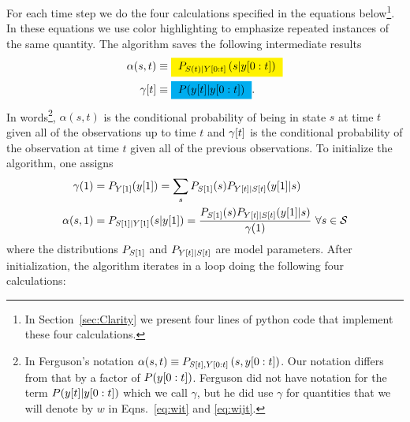 For each time step we do the four calculations specified in the
equations below\footnote{In Section~\ref{sec:Clarity} we present four
  lines of python code that implement these four calculations.}.  In
these equations we use color highlighting to emphasize repeated
instances of the same quantity.  The algorithm saves the following
intermediate results
%
%
\begin{align}
  \label{eq:alpha}
  \alpha(s,t) &\equiv \alphax{t}{s}\\
  \label{eq:gamma}
  \ti{\gamma}{t} &\equiv \gammax .
\end{align}
In words\footnote{In Ferguson's notation $\alpha(s,t) \equiv
  P_{{S}{[t]},Y[0:t]} \left(s,y[0:t] \right)$.  Our
  notation differs from that by a factor of $P(y[0:t])$.
  Ferguson did not have notation for the term
  $P({y}{[t]}|y[0:t])$ which we call $\gamma$, but he did use
  $\gamma$ for quantities that we will denote by $w$ in
  Eqns.~\eqref{eq:wit} and \eqref{eq:wijt}.}, $\alpha(s,t)$ is the
conditional probability of being in state $s$ at time $t$ given all
of the observations up to time $t$ and ${\gamma}{[t]}$ is the
conditional probability of the observation at time $t$ given all of
the previous observations.  To initialize the algorithm, one assigns
\begin{align*}
  \gamma(1) &= P_{\ti{Y}{1}}(\ti{y}{1}) =
              \sum_{s}P_{\ti{S}{1}}(s)P_{\ti{Y}{t}|\ti{S}{t}}(\ti{y}{1}|s)
  \\
  \alpha(s,1) &= P_{\ti{S}{1}|\ti{Y}{1}}(s|\ti{y}{1}) =
  \frac{P_{\ti{S}{1}}(s)P_{\ti{Y}{t}|\ti{S}{t}}(\ti{y}{1}|s)}
  {\gamma(1)}
~\forall s \in \states
\end{align*}
where the distributions $P_{{S}{[1]}}$ and $P_{{Y}{[t]}|{S}{[t]}}$
are model parameters.  After initialization, the algorithm iterates in
a loop doing the following four calculations: 
